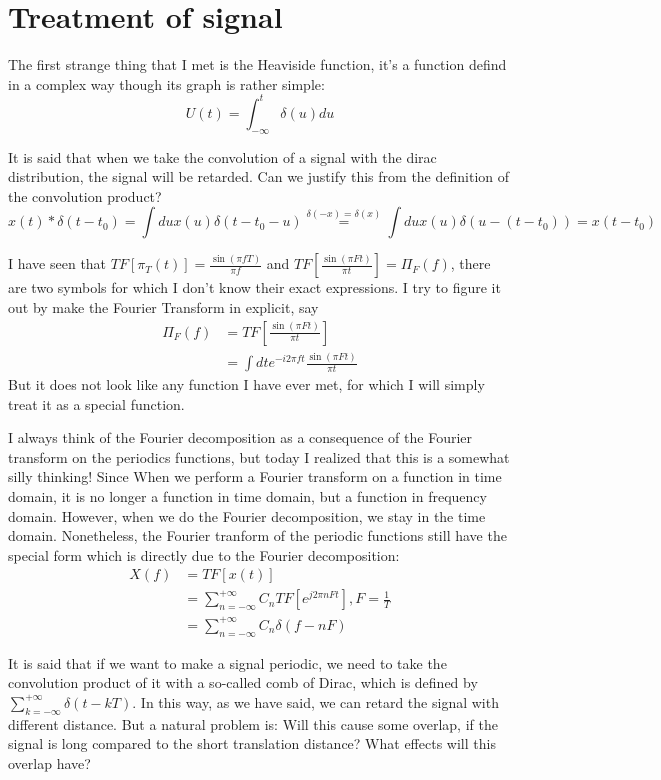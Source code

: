 \section{Treatment of signal}
The first strange thing that I met is the Heaviside function, it's a function defind in a complex way though its graph is rather simple:
$$
U(t)=\int_{-\infty}^{t}\delta(u)du
$$

It is said that when we take the convolution of a signal with the dirac distribution, the signal will be retarded. Can we justify this from the definition of the convolution product?
$$
x(t)*\delta(t-t_0)=\int du x(u)\delta (t-t_0-u)\overset{\delta(-x)=\delta(x)}{=}\int du x(u)\delta (u-(t-t_0))=x(t-t_0)
$$

I have seen that $TF\left[\pi_T(t)\right]=\frac{\sin(\pi fT)}{\pi f}$ and $TF\left[\frac{\sin(\pi Ft)}{\pi t}\right]=\Pi_{F}(f)$, there are two symbols for which I don't know their exact expressions. I try to figure it out by make the Fourier Transform in explicit, say
$$
\begin{aligned}
\Pi_{F}(f)&=TF\left[\frac{\sin(\pi Ft)}{\pi t}\right]\\
&=\int dte^{-i2\pi ft}\frac{\sin(\pi Ft)}{\pi t}
\end{aligned}
$$
But it does not look like any function I have ever met, for which I will simply treat it as a special function.

I always think of the Fourier decomposition as a consequence of the Fourier transform on the periodics functions, but today I realized that this is a somewhat silly thinking! Since When we perform a Fourier transform on a function in time domain, it is no longer a function in time domain, but a function in frequency domain. However, when we do the Fourier decomposition, we stay in the time domain. Nonetheless, the Fourier tranform of the periodic functions still have the special form which is directly due to the Fourier decomposition:
$$
\begin{aligned}
X(f)&=TF\left[x(t)\right]\\
&=\sum_{n=-\infty}^{+\infty}C_n TF[e^{j2\pi nF t}],F=\frac{1}{T}\\
&=\sum_{n=-\infty}^{+\infty}C_n\delta(f-nF)
\end{aligned}
$$

It is said that if we want to make a signal periodic, we need to take the convolution product of it with a so-called comb of Dirac, which is defined by $\sum_{k=-\infty}^{+\infty}\delta(t-kT)$. In this way, as we have said, we can retard the signal with different distance. But a natural problem is: Will this cause some overlap, if the signal is long compared to the short translation distance? What effects will this overlap have?

